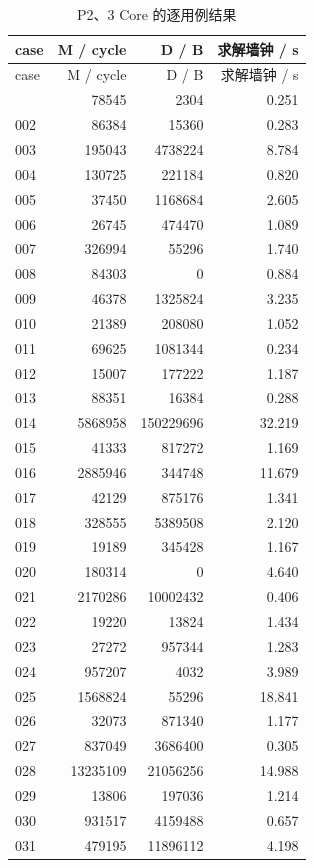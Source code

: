 \documentclass[anonymous,notoc]{gmcm2026}
\begin{document}
\begin{longtable}{lrrr}
\caption{P2、3 Core 的逐用例结果}\\
\toprule
case & M / cycle & D / B & 求解墙钟 / s\\\midrule
\endfirsthead
\toprule
case & M / cycle & D / B & 求解墙钟 / s\\\midrule
\endhead
\bottomrule\endfoot
001 & 78545 & 2304 & 0.251 \\
002 & 86384 & 15360 & 0.283 \\
003 & 195043 & 4738224 & 8.784 \\
004 & 130725 & 221184 & 0.820 \\
005 & 37450 & 1168684 & 2.605 \\
006 & 26745 & 474470 & 1.089 \\
007 & 326994 & 55296 & 1.740 \\
008 & 84303 & 0 & 0.884 \\
009 & 46378 & 1325824 & 3.235 \\
010 & 21389 & 208080 & 1.052 \\
011 & 69625 & 1081344 & 0.234 \\
012 & 15007 & 177222 & 1.187 \\
013 & 88351 & 16384 & 0.288 \\
014 & 5868958 & 150229696 & 32.219 \\
015 & 41333 & 817272 & 1.169 \\
016 & 2885946 & 344748 & 11.679 \\
017 & 42129 & 875176 & 1.341 \\
018 & 328555 & 5389508 & 2.120 \\
019 & 19189 & 345428 & 1.167 \\
020 & 180314 & 0 & 4.640 \\
021 & 2170286 & 10002432 & 0.406 \\
022 & 19220 & 13824 & 1.434 \\
023 & 27272 & 957344 & 1.283 \\
024 & 957207 & 4032 & 3.989 \\
025 & 1568824 & 55296 & 18.841 \\
026 & 32073 & 871340 & 1.177 \\
027 & 837049 & 3686400 & 0.305 \\
028 & 13235109 & 21056256 & 14.988 \\
029 & 13806 & 197036 & 1.214 \\
030 & 931517 & 4159488 & 0.657 \\
031 & 479195 & 11896112 & 4.198 \\

\end{longtable}
\end{document}
